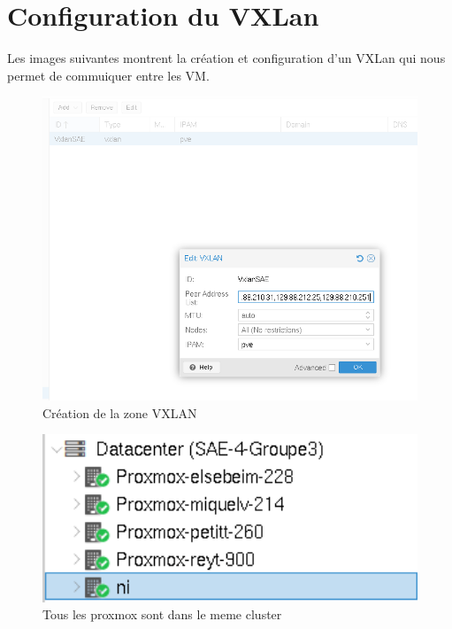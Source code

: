 \documentclass{article}
\begin{document}
\FloatBarrier

\section{Configuration du VXLan}

Les images suivantes montrent la création et configuration d'un VXLan qui nous permet de commuiquer entre les VM.

\begin{figure}[h]
    \centering
    \includegraphics[width=1\textwidth]{VxLan.png}
    \caption{Création de la zone VXLAN}
\end{figure}

\FloatBarrier

\begin{figure}[h]
    \centering
    \includegraphics[width=1\textwidth]{Promox-1.png}
    \caption{Tous les proxmox sont dans le meme cluster}
\end{figure}
\end{document}
